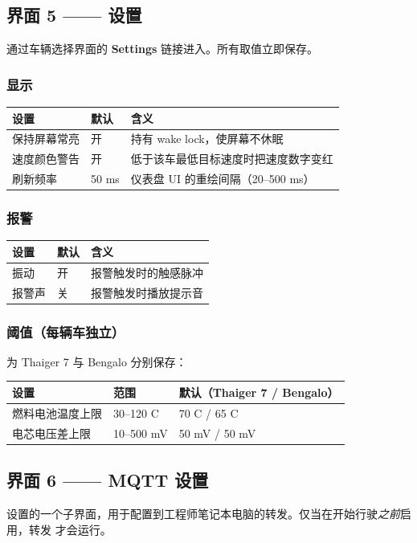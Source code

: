 \documentclass[11pt,a4paper,oneside]{report}
\newcommand{\degC}{\textdegree C}
\begin{document}
\subsection{界面 5 —— 设置}
通过车辆选择界面的 \textbf{Settings} 链接进入。所有取值立即保存。

\subsubsection{显示}

\begin{tabularx}{\linewidth}{@{}llL@{}}
\toprule
\textbf{设置} & \textbf{默认} & \textbf{含义}\\
\midrule
保持屏幕常亮 & 开 & 持有 wake lock，使屏幕不休眠\\
速度颜色警告 & 开 & 低于该车最低目标速度时把速度数字变红\\
刷新频率 & 50 ms & 仪表盘 UI 的重绘间隔（20--500 ms）\\
\bottomrule
\end{tabularx}

\subsubsection{报警}

\begin{tabularx}{\linewidth}{@{}llL@{}}
\toprule
\textbf{设置} & \textbf{默认} & \textbf{含义}\\
\midrule
振动 & 开 & 报警触发时的触感脉冲\\
报警声 & 关 & 报警触发时播放提示音\\
\bottomrule
\end{tabularx}

\subsubsection{阈值（每辆车独立）}
为 Thaiger 7 与 Bengalo 分别保存：

\begin{tabularx}{\linewidth}{@{}llL@{}}
\toprule
\textbf{设置} & \textbf{范围} & \textbf{默认（Thaiger 7 / Bengalo）}\\
\midrule
燃料电池温度上限 & 30--120 \degC{} & 70 \degC{} / 65 \degC{}\\
电芯电压差上限 & 10--500 mV & 50 mV / 50 mV\\
\bottomrule
\end{tabularx}

\subsection{界面 6 —— MQTT 设置}
设置的一个子界面，用于配置到工程师笔记本电脑的转发。仅当在开始行驶\emph{之前}启用，转发
才会运行。
\end{document}
